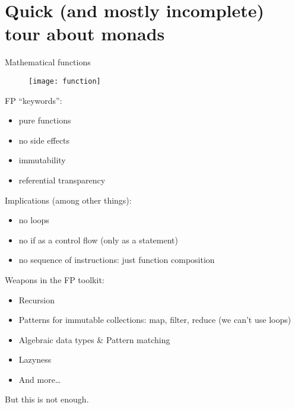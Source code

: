 \documentclass[10pt]{beamer}
\begin{document}
\section{Quick (and mostly incomplete) tour about monads}
\begin{frame}{Mathematical functions}
	\begin{figure}
		\centering
		\texttt{[image: function]}
	\end{figure}
\end{frame}
\begin{frame}
	FP ``keywords'':
	\begin{itemize}
		\item pure functions 
		\item no side effects 
		\item immutability
		\item referential transparency 
	\end{itemize}

	Implications (among other things):
	\begin{itemize}
		\item no loops
		\item no if as a control flow (only as a statement)
		\item no sequence of instructions: just function composition
	\end{itemize}

\end{frame}
\begin{frame}
	Weapons in the FP toolkit:
	\begin{itemize}
		\item Recursion 
		\item Patterns for immutable collections: map, filter, reduce  (we can't use loops)
		\item Algebraic data types \& Pattern matching
		\item Lazyness
		\item And more\ldots 
	\end{itemize}
	But this is not enough. 
\end{frame}
\end{document}
